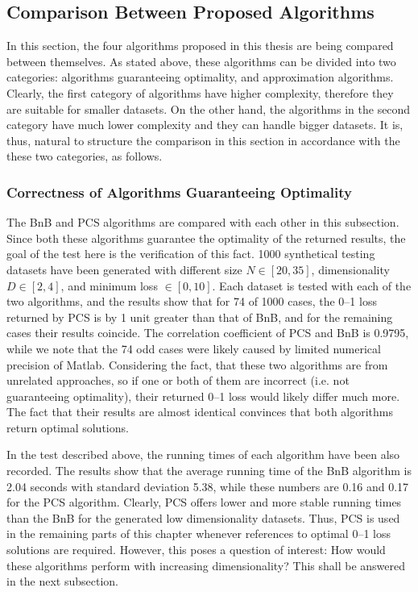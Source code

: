 \subsection{Comparison Between Proposed Algorithms}
\label{sec:rc.proposed}

In this section, the four algorithms proposed in this thesis are being compared between themselves. As stated above, these algorithms can be divided into two categories: algorithms guaranteeing optimality, and approximation algorithms. Clearly, the first category of algorithms have higher complexity, therefore they are suitable for smaller datasets. On the other hand, the algorithms in the second category have much lower complexity and they can handle bigger datasets. It is, thus, natural to structure the comparison in this section in accordance with the these two categories, as follows.    

\subsubsection{Correctness of Algorithms Guaranteeing Optimality}
\label{ssec:rc.optimal}

The BnB and PCS algorithms are compared with each other in this subsection. Since both these algorithms guarantee the optimality of the returned results, the goal of the test here is the verification of this fact. 1000 synthetical testing datasets have been generated with different size $N \in [20, 35]$, dimensionality $D \in [2, 4]$, and minimum loss $\in [0, 10]$. Each dataset is tested with each of the two algorithms, and the results show that for 74 of 1000 cases, the 0--1 loss returned by PCS is by 1 unit greater than that of BnB, and for the remaining cases their results coincide. The correlation coefficient of PCS and BnB is 0.9795, while we note that the 74 odd cases were likely caused by limited numerical precision of Matlab. Considering the fact, that these two algorithms are from unrelated approaches, so if one or both of them are incorrect (i.e. not guaranteeing optimality), their returned 0--1 loss would likely differ much more. The fact that their results are almost identical convinces that both algorithms return optimal solutions. 

In the test described above, the running times of each algorithm have been also recorded. The results show that the average running time of the BnB algorithm is 2.04 seconds with standard deviation 5.38, while these numbers are 0.16 and 0.17 for the PCS algorithm. Clearly, PCS offers lower and more stable running times than the BnB for the generated low dimensionality datasets. Thus, PCS is used in the remaining parts of this chapter whenever references to optimal 0--1 loss solutions are required. However, this poses a question of interest: How would these algorithms perform with increasing dimensionality? This shall be answered in the next subsection. 

